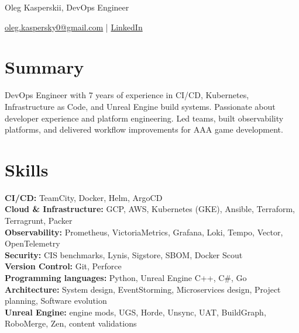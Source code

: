 \documentclass[10.5pt]{article}
\begin{document}
\centerline{\Large Oleg Kasperskii, DevOps Engineer}

\vspace{4pt}

\centerline{\href{mailto:oleg.kaspersky0@gmail.com}{oleg.kaspersky0@gmail.com} | \href{https://www.linkedin.com/in/oleg-kasperskii/}{LinkedIn}}

\vspace{-8pt}

\section*{Summary}
DevOps Engineer with 7 years of experience in CI/CD, Kubernetes, Infrastructure as Code, and Unreal Engine build systems. Passionate about developer experience and platform engineering. Led teams, built observability platforms, and delivered workflow improvements for AAA game development.

\vspace{-6pt}

\section*{Skills}
\textbf{CI/CD:} TeamCity, Docker, Helm, ArgoCD \\
\textbf{Cloud \& Infrastructure:} GCP, AWS, Kubernetes (GKE), Ansible, Terraform, Terragrunt, Packer \\
\textbf{Observability:} Prometheus, VictoriaMetrics, Grafana, Loki, Tempo, Vector, OpenTelemetry \\
\textbf{Security:} CIS benchmarks, Lynis, Sigstore, SBOM, Docker Scout \\
\textbf{Version Control:} Git, Perforce \\
\textbf{Programming languages:} Python, Unreal Engine C++, C\#, Go \\
\textbf{Architecture:} System design, EventStorming, Microservices design, Project planning, Software evolution \\
\textbf{Unreal Engine:} engine mods, UGS, Horde, Unsync, UAT, BuildGraph, RoboMerge, Zen, content validations \\

\vspace{-6pt}
\end{document}
